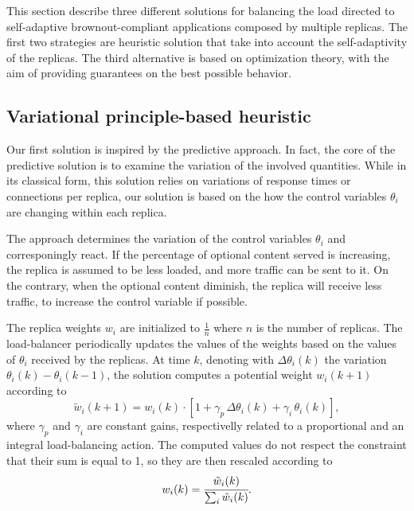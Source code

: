 This section describe three different solutions for balancing the load
directed to self-adaptive brownout-compliant applications composed by
multiple replicas. The first two strategies are heuristic solution
that take into account the self-adaptivity of the replicas. The third
alternative is based on optimization theory, with the aim of providing
guarantees on the best possible behavior.

\subsection{Variational principle-based heuristic}

Our first solution is inspired by the predictive approach. In fact,
the core of the predictive solution is to examine the variation of the
involved quantities. While in its classical form, this solution relies
on variations of response times or connections per replica, our
solution is based on the how the control variables $\theta_i$ are
changing within each replica.

The approach determines the variation of the control variables
$\theta_i$ and corresponingly react. If the percentage of optional
content served is increasing, the replica is assumed to be less
loaded, and more traffic can be sent to it. On the contrary, when the
optional content diminish, the replica will receive less traffic, to
increase the control variable if possible.

The replica weights $w_i$ are initialized to $\frac{1}{n}$ where $n$
is the number of replicas. The load-balancer periodically updates the
values of the weights based on the values of $\theta_i$ received by
the replicas. At time $k$, denoting with $\Delta \theta_i (k)$ the
variation $\theta_i (k) - \theta_i (k-1)$, the solution computes a
potential weight $w_i(k+1)$ according to
\begin{equation}
  \tilde{w}_i(k+1) = w_i(k) \cdot 
\left[ 1 + \gamma_p \, \Delta \theta_i (k) + \gamma_i \, \theta_i (k) \right] ,
\label{eq:theta-diff}
\end{equation}
where $\gamma_p$ and $\gamma_i$ are constant gains, respectivelly
related to a proportional and an integral load-balancing action. The
computed values do not respect the constraint that their sum is equal
to 1, so they are then rescaled according to
\begin{equation}
  w_i (k) = \cfrac{\tilde{w}_i (k)}{\sum_i \tilde{w}_i (k)}.
\label{eq:theta-diff-rescale}
\end{equation}

